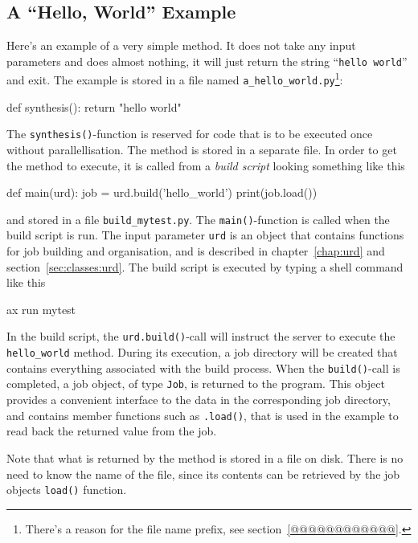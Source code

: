 \subsection{A ``Hello, World'' Example}
Here's an example of a very simple method.  It does not take any input
parameters and does almost nothing, it will just return the string
``\texttt{hello world}'' and exit.  The example is stored in a file
named \texttt{a\_hello\_world.py}\footnote{There's a reason for the
file name prefix, see section~\ref{@@@@@@@@@@@@}.}:
\begin{python}
def synthesis():
    return "hello world"
\end{python}
The \texttt{synthesis()}-function is reserved for code that is to be
executed once without parallellisation.  The method is stored in a
separate file.  In order to get the method to execute, it is called
from a \textsl{build script} looking something like this
\begin{python}
def main(urd):
    job = urd.build('hello_world')
    print(job.load())
\end{python}
and stored in a file \texttt{build\_mytest.py}.  The
\texttt{main()}-function is called when the build script is run.  The
input parameter \texttt{urd} is an object that contains functions for
job building and organisation, and is described in
chapter~\ref{chap:urd} and section~\ref{sec:classes:urd}.  The build
script is executed by typing a shell command like this
\begin{shell}
ax run mytest
\end{shell}
In the build script, the \texttt{urd.build()}-call will instruct the
server to execute the \texttt{hello\_world} method.  During
its execution, a job directory will be created that contains
everything associated with the build process.  When the
\texttt{build()}-call is completed, a job object, of type
\texttt{Job}, is returned to the program.  This object provides a
convenient interface to the data in the corresponding job directory,
and contains member functions such as \texttt{.load()}, that is used
in the example to read back the returned value from the job.

Note that what is returned by the method is stored in a file on disk.
There is no need to know the name of the file, since its contents can
be retrieved by the job objects \texttt{load()} function.



